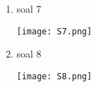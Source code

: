 \documentclass[8pt, a4paper]{article}
\newcommand{\lstinputwithcaption}[2]{%
    }
\begin{document}
\begin{enumerate}
\begin{multicols}{2}
\begin{center}
            \end{center}
          \end{multicols}

        \item soal 7

          \begin{multicols}{2}
            \begin{center}

              \lstinputwithcaption{./code/src/soal7/Main.java}{Main.java}

              \texttt{[image: S7.png]}

              \columnbreak

              \lstinputwithcaption{./code/src/soal7/ThreadPrint.java}{ThreadPrint.java}


            \end{center}
          \end{multicols}

        \item soal 8

          \begin{multicols}{2}
            \begin{center}

              \lstinputwithcaption{./code/src/soal8/Main.java}{Main.java}

              \columnbreak

              \texttt{[image: S8.png]}

            \end{center}
          \end{multicols}

      \end{enumerate}

    
\end{document}
